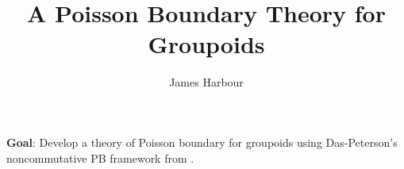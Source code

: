 \documentclass[12pt]{article}
\title{A Poisson Boundary Theory for Groupoids}
\author{James Harbour}
\begin{document}
\maketitle

\textbf{Goal}: Develop a theory of Poisson boundary for groupoids using Das-Peterson's noncommutative PB framework from \cite{dp:22}.




\printbibliography
\end{document}
